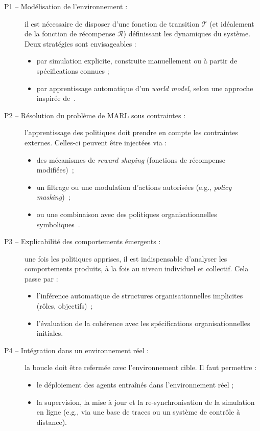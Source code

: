 \documentclass[ twoside,openright,titlepage,numbers=noenddot,headinclude,%
                footinclude=true,cleardoublepage=empty,abstractoff, %
                BCOR=5mm,paper=a4,fontsize=11pt,%
                french,american,%
                ]{scrreprt}
\begin{document}
\begin{description}
    \item[P1 -- Modélisation de l'environnement :] il est nécessaire de disposer d'une fonction de transition \(\mathcal{T}\) (et idéalement de la fonction de récompense \(\mathcal{R}\)) définissant les dynamiques du système. Deux stratégies sont envisageables :
        \begin{itemize}
            \item par simulation explicite, construite manuellement ou à partir de spécifications connues ;
            \item par apprentissage automatique d'un \textit{world model}, selon une approche inspirée de~\cite{Ha2018}.
        \end{itemize}

    \item[P2 -- Résolution du problème de MARL sous contraintes :] l'apprentissage des politiques doit prendre en compte les contraintes externes. Celles-ci peuvent être injectées via :
        \begin{itemize}
            \item des mécanismes de \textit{reward shaping} (fonctions de récompense modifiées)~\cite{Ng1999};
            \item un filtrage ou une modulation d'actions autorisées (e.g., \textit{policy masking})~\cite{ElsayedAly2021};
            \item ou une combinaison avec des politiques organisationnelles symboliques~\cite{Boella2008,Hubner2002}.
        \end{itemize}

    \item[P3 -- Explicabilité des comportements émergents :] une fois les politiques apprises, il est indispensable d'analyser les comportements produits, à la fois au niveau individuel et collectif. Cela passe par :
        \begin{itemize}
            \item l'inférence automatique de structures organisationnelles implicites (rôles, objectifs)~\cite{Rahwan2009};
            \item l'évaluation de la cohérence avec les spécifications organisationnelles initiales.
        \end{itemize}

    \item[P4 -- Intégration dans un environnement réel :] la boucle doit être refermée avec l'environnement cible. Il faut permettre :
        \begin{itemize}
            \item le déploiement des agents entraînés dans l'environnement réel ;
            \item la supervision, la mise à jour et la re-synchronisation de la simulation en ligne (e.g., via une base de traces ou un système de contrôle à distance).
        \end{itemize}
\end{description}
\end{document}
